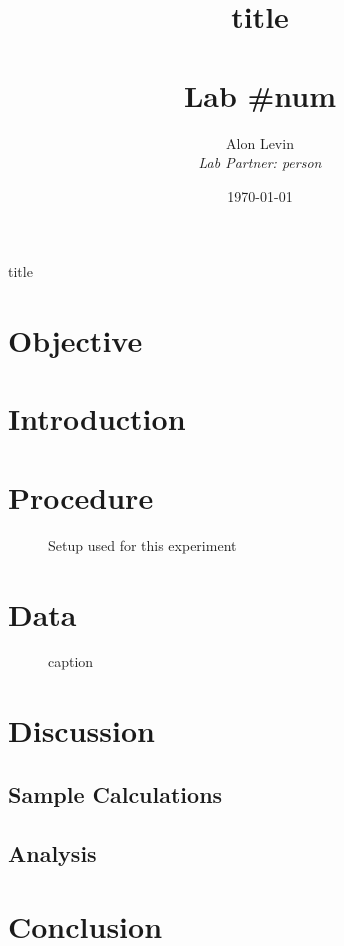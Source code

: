 \documentclass[11pt, titlepage]{article}
\title{\Huge{title} \\ \ \\ \huge Lab \#num}
\author{\Large{Alon Levin} \\ \emph{Lab Partner: person}}
\date{\today}
\begin{document}
\maketitle

\begin{center}
\LARGE title
\end{center}

\section*{Objective}

\section*{Introduction}

\section*{Procedure}

\pagebreak
\begin{figure}[!ht]
\centering
\caption{Setup used for this experiment}
\end{figure}

\pagebreak
\section*{Data}
\begin{center}

\begin{figure}[!ht]
\caption{caption}
\end{figure}
\end{center}

\pagebreak
\section*{Discussion}
\subsection*{Sample Calculations}

\subsection*{Analysis}

\section*{Conclusion}
\end{document}

